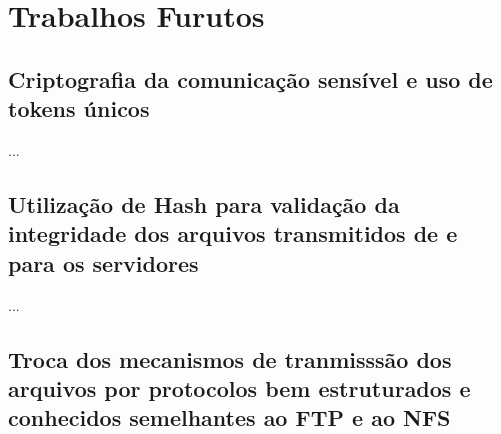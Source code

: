 \section{Trabalhos Furutos}

\subsection {Criptografia da comunicação sensível e uso de tokens únicos}
...
\subsection {Utilização de Hash para validação da integridade dos arquivos transmitidos de e para os servidores}
...

\subsection{Troca dos mecanismos de tranmisssão dos arquivos por protocolos bem estruturados e conhecidos semelhantes ao FTP e ao NFS}



